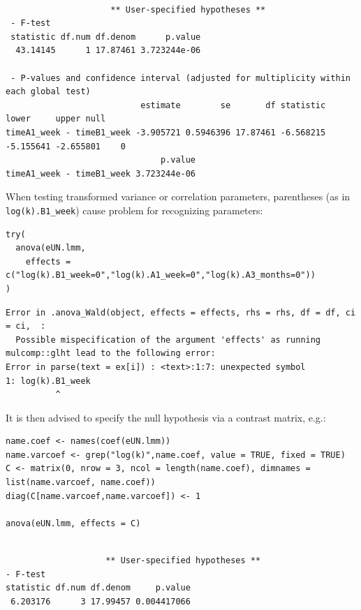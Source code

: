 \documentclass[12pt]{article}
\begin{document}
\begin{verbatim}

                     ** User-specified hypotheses ** 
 - F-test
 statistic df.num df.denom      p.value
  43.14145      1 17.87461 3.723244e-06

 - P-values and confidence interval (adjusted for multiplicity within each global test) 
                           estimate        se       df statistic     lower     upper null
timeA1_week - timeB1_week -3.905721 0.5946396 17.87461 -6.568215 -5.155641 -2.655801    0
                               p.value
timeA1_week - timeB1_week 3.723244e-06
\end{verbatim}

When testing transformed variance or correlation parameters,
parentheses (as in \texttt{log(k).B1\_week}) cause problem for recognizing
parameters:
\lstset{language=r,label= ,caption= ,captionpos=b,numbers=none}
\begin{lstlisting}
try(
  anova(eUN.lmm,
	effects = c("log(k).B1_week=0","log(k).A1_week=0","log(k).A3_months=0"))
)
\end{lstlisting}

\begin{verbatim}
Error in .anova_Wald(object, effects = effects, rhs = rhs, df = df, ci = ci,  : 
  Possible mispecification of the argument 'effects' as running mulcomp::glht lead to the following error: 
Error in parse(text = ex[i]) : <text>:1:7: unexpected symbol
1: log(k).B1_week
          ^
\end{verbatim}


It is then advised to specify the null hypothesis via a contrast matrix, e.g.:
\lstset{language=r,label= ,caption= ,captionpos=b,numbers=none}
\begin{lstlisting}
name.coef <- names(coef(eUN.lmm))
name.varcoef <- grep("log(k)",name.coef, value = TRUE, fixed = TRUE)
C <- matrix(0, nrow = 3, ncol = length(name.coef), dimnames = list(name.varcoef, name.coef))
diag(C[name.varcoef,name.varcoef]) <- 1

anova(eUN.lmm, effects = C)
\end{lstlisting}

\begin{verbatim}

                    ** User-specified hypotheses ** 
- F-test
statistic df.num df.denom     p.value
 6.203176      3 17.99457 0.004417066
\end{verbatim}
\end{document}

